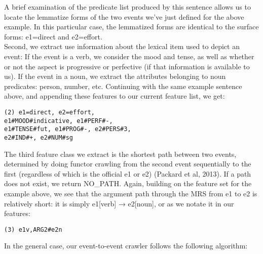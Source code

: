 \documentclass[11pt]{article}
\begin{document}
A brief examination of the predicate list produced by this sentence allows us to locate the lemmatize forms of the two events we've just defined for the above example. In this particular case, the lemmatized forms are identical to the surface forms: e1=direct and e2=effort.
\\
\indent Second, we extract use information about the lexical item used to depict an event: If the event is a verb, we consider the mood and
tense, as well as whether or not the aspect is progressive or perfective (if that information
is available to us). If the event in a noun, we extract the attributes belonging to noun predicates: person, number, etc. Continuing with the same example sentence above, and appending these features to
our current feature list, we get: 
\begin{verbatim}(2) e1=direct, e2=effort, 
e1#MOOD#indicative, e1#PERF#-, 
e1#TENSE#fut, e1#PROG#-, e2#PERS#3,
e2#IND#+, e2#NUM#sg 
\end{verbatim}
The third feature class we extract is the shortest path between two events, determined by doing functor crawling from the second event sequentially to the first (regardless of which is the official e1 or e2) (Packard et al, 2013). If a path does not exist, we return NO\_PATH. Again, building on the feature set for the example
above, we see that the argument path through the MRS from e1 to e2 is relatively short: it is simply
e1[verb] → e2[noun], or as we notate it in our features: 
\begin{verbatim}(3) e1v,ARG2#e2n\end{verbatim}
In the general case, our event-to-event crawler follows the following algorithm:
\end{document}
